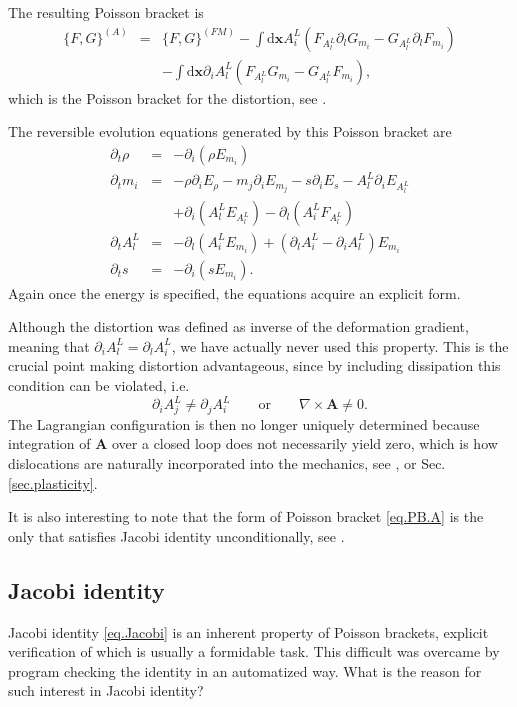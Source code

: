 \documentclass[
10pt, %
a4paper, %
oneside, %
headinclude,footinclude, %
BCOR5mm, %
]{scrartcl}
\newcommand{\xx}{\mathbf{x}}
\newcommand{\dx}{\mathrm{d}\xx}
\renewcommand{\AA}{\mathbf{A}}
\begin{document}
The resulting Poisson bracket is
\begin{eqnarray}\label{eq.PB.A}
	\{F,G\}^{(A)} &=& \{F,G\}^{(FM)} - \int\dx A^L_i (F_{A^L_l} \partial_l G_{m_i}-G_{A^L_l} \partial_l F_{m_i})\nonumber\\
	&&-\int\dx \partial_i A^L_l (F_{A^L_l}G_{m_i}-G_{A^L_l}F_{m_i}),
\end{eqnarray}
which is the Poisson bracket for the distortion, see \cite{SHTC-GENERIC}.

The reversible evolution equations generated by this Poisson bracket are
\begin{subequations}
	\begin{eqnarray}
	\partial_t \rho &=& -\partial_i(\rho E_{m_i})\\
	\partial_t m_i &=& -\rho\partial_i E_\rho - m_j \partial_i E_{m_j} -s \partial_i E_s - A^L_l\partial_i E_{A^L_l} \nonumber\\
		&&+\partial_i(A^L_l E_{A^L_l}) - \partial_l(A^L_i F_{A^L_l})\\
		\partial_t A^L_l &=& -\partial_l (A^L_i E_{m_i}) + (\partial_l A^L_i - \partial_i A^L_l) E_{m_i}\\
	\partial_t s &=& -\partial_i(s E_{m_i}).
	\end{eqnarray}
\end{subequations}
Again once the energy is specified, the equations acquire an explicit form.

Although the distortion was defined as inverse of the deformation gradient, meaning that $\partial_i A^L_l = \partial_l A^L_i$, we have actually never used this property. This is the crucial point making distortion advantageous, since by including dissipation this condition can be violated, i.e.
		\begin{equation}
			\partial_i A^L_j \neq \partial_j A^L_i \qquad \mbox{or}\qquad \nabla\times \AA \neq 0.
		\end{equation}
The Lagrangian configuration is then no longer uniquely determined because integration of $\AA$ over a closed loop does not necessarily yield zero, which is how dislocations are naturally incorporated into the mechanics, see \cite{ADER}, \cite{Landau7} or Sec. \ref{sec.plasticity}.

It is also interesting to note that the form of Poisson bracket \eqref{eq.PB.A} is the only that satisfies Jacobi identity unconditionally, see \cite{SHTC-GENERIC}.

\subsection{Jacobi identity}
Jacobi identity \eqref{eq.Jacobi} is an inherent property of Poisson brackets, explicit verification of which is usually a formidable task. This difficult was overcame by program \cite{kroeger2010} checking the identity in an automatized way. What is the reason for such interest in Jacobi identity?
\end{document}
